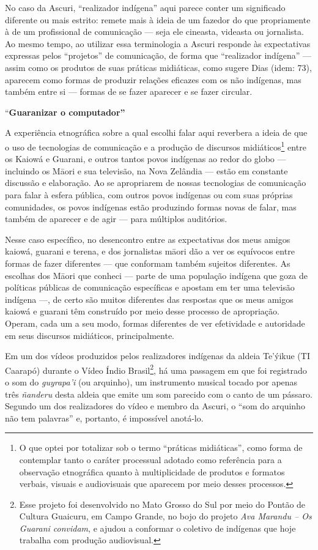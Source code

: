 No caso da Ascuri, ``realizador indígena'' aqui parece conter um
significado diferente ou mais estrito: remete mais à ideia de um fazedor
do que propriamente à de um profissional de comunicação --- seja ele
cineasta, videasta ou jornalista. Ao mesmo tempo, ao utilizar essa
terminologia a Ascuri responde às expectativas expressas pelos
``projetos'' de comunicação, de forma que ``realizador indígena'' ---
assim como os produtos de suas práticas midiáticas, como sugere Dias
(idem: 73), aparecem como formas de produzir relações eficazes com os
não indígenas, mas também entre si --- formas de se fazer aparecer e se
fazer circular.

``\textbf{Guaranizar o computador''}

A experiência etnográfica sobre a qual escolhi falar aqui reverbera a
ideia de que o uso de tecnologias de comunicação e a produção de
discursos midiáticos\footnote{O que optei por totalizar sob o termo
  ``práticas midiáticas'', como forma de contemplar tanto o caráter
  processual adotado como referência para a observação etnográfica
  quanto à multiplicidade de produtos e formatos verbais, visuais e
  audiovisuais que aparecem por meio desses processos.} entre os Kaiowá
e Guarani, e outros tantos povos indígenas ao redor do globo ---
incluindo os Māori e sua televisão, na Nova Zelândia --- estão em
constante discussão e elaboração. Ao se apropriarem de nossas
tecnologias de comunicação para falar à esfera pública, com outros povos
indígenas ou com suas próprias comunidades, os povos indígenas estão
produzindo formas novas de falar, mas também de aparecer e de agir ---
para múltiplos auditórios.

Nesse caso específico, no desencontro entre as expectativas dos meus
amigos kaiowá, guarani e terena, e dos jornalistas māori dão a ver os
equívocos entre formas de fazer diferentes --- que conformam também
sujeitos diferentes. As escolhas dos Māori que conheci --- parte de uma
população indígena que goza de políticas públicas de comunicação
específicas e apostam em ter uma televisão indígena ---, de certo são
muitos diferentes das respostas que os meus amigos kaiowá e guarani têm
construído por meio desse processo de apropriação. Operam, cada um a seu
modo, formas diferentes de ver efetividade e autoridade em seus
discursos midiáticos, principalmente.

Em um dos vídeos produzidos pelos realizadores indígenas da aldeia
Te'ýikue (TI Caarapó) durante o Vídeo Índio Brasil\footnote{Esse projeto
  foi desenvolvido no Mato Grosso do Sul por meio do Pontão de Cultura
  Guaicuru, em Campo Grande, no bojo do projeto \emph{Ava Marandu -- Os
  Guarani convidam}, e ajudou a conformar o coletivo de indígenas que
  hoje trabalha com produção audiovisual.}, há uma passagem em que foi
registrado o som do \emph{guyrapa'i} (ou arquinho), um instrumento
musical tocado por apenas três \emph{ñanderu} desta aldeia que emite um
som parecido com o canto de um pássaro. Segundo um dos realizadores do
vídeo e membro da Ascuri, o ``som do arquinho não tem palavras'' e,
portanto, é impossível anotá-lo.

